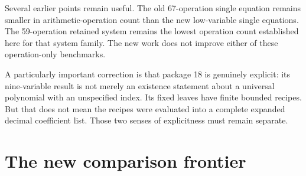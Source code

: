 \documentclass[
  10pt,
]{article}
\let\oldsection\section
\renewcommand{\section}{\clearpage\oldsection}
\begin{document}
Several earlier points remain useful. The old 67-operation single
equation remains smaller in arithmetic-operation count than the new
low-variable single equations. The 59-operation retained system remains
the lowest operation count established here for that system family. The
new work does not improve either of these operation-only benchmarks.

A particularly important correction is that package 18 is genuinely
explicit: its nine-variable result is not merely an existence statement
about a universal polynomial with an unspecified index. Its fixed leaves
have finite bounded recipes. But that does not mean the recipes were
evaluated into a complete expanded decimal coefficient list. Those two
senses of explicitness must remain separate.

\section{The new comparison frontier}\label{the-new-comparison-frontier}
\end{document}
